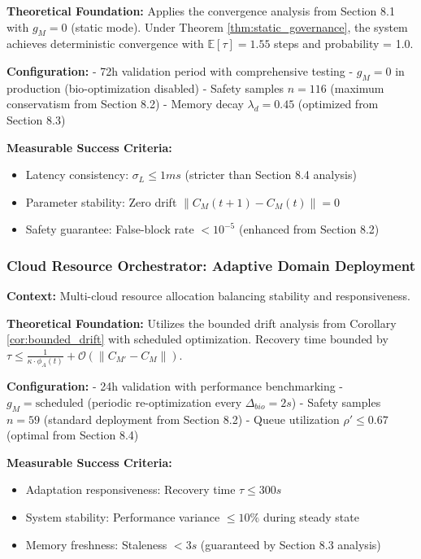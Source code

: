\documentclass{article}
\begin{document}
\textbf{Theoretical Foundation:} Applies the convergence analysis from Section 8.1 with $g_M = 0$ (static mode). Under Theorem \ref{thm:static_governance}, the system achieves deterministic convergence with $\mathbb{E}[\tau] = 1.55$ steps and probability = 1.0.

\textbf{Configuration:} 
- 72h validation period with comprehensive testing
- $g_M = 0$ in production (bio-optimization disabled)
- Safety samples $n = 116$ (maximum conservatism from Section 8.2)
- Memory decay $\lambda_d = 0.45$ (optimized from Section 8.3)

\textbf{Measurable Success Criteria:}
\begin{itemize}
\item Latency consistency: $\sigma_L \leq 1ms$ (stricter than Section 8.4 analysis)
\item Parameter stability: Zero drift $\|C_M(t+1) - C_M(t)\| = 0$
\item Safety guarantee: False-block rate $< 10^{-5}$ (enhanced from Section 8.2)
\end{itemize}

\subsubsection{Cloud Resource Orchestrator: Adaptive Domain Deployment}

\textbf{Context:} Multi-cloud resource allocation balancing stability and responsiveness.

\textbf{Theoretical Foundation:} Utilizes the bounded drift analysis from Corollary \ref{cor:bounded_drift} with scheduled optimization. Recovery time bounded by $\tau \leq \frac{1}{\kappa \cdot \phi_A(t)} + \mathcal{O}(\|C_{M'} - C_M\|)$.

\textbf{Configuration:}
- 24h validation with performance benchmarking
- $g_M = \text{scheduled}$ (periodic re-optimization every $\Delta_{bio} = 2s$)
- Safety samples $n = 59$ (standard deployment from Section 8.2)
- Queue utilization $\rho' \leq 0.67$ (optimal from Section 8.4)

\textbf{Measurable Success Criteria:}
\begin{itemize}
\item Adaptation responsiveness: Recovery time $\tau \leq 300s$
\item System stability: Performance variance $\leq 10\%$ during steady state
\item Memory freshness: Staleness $< 3s$ (guaranteed by Section 8.3 analysis)
\end{itemize}
\end{document}
